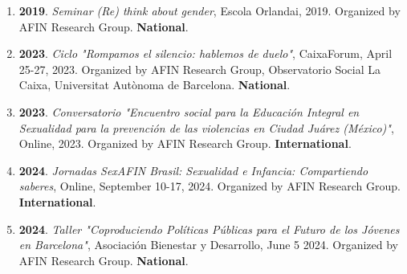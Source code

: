 \begin{enumerate}
\item {\bf 2019}. {\it Seminar (Re) think about gender}, Escola Orlandai, 2019. Organized by AFIN Research Group. {\bf National}.\filbreak
\item {\bf 2023}. {\it Ciclo "Rompamos el silencio: hablemos de duelo"}, CaixaForum, April 25-27, 2023. Organized by AFIN Research Group, Observatorio Social La Caixa, Universitat Autònoma de Barcelona. {\bf National}.\filbreak
\item {\bf 2023}. {\it Conversatorio "Encuentro social para la Educación Integral en Sexualidad para la prevención de las violencias en Ciudad Juárez (México)"}, Online, 2023. Organized by AFIN Research Group. {\bf International}.\filbreak
\item {\bf 2024}. {\it Jornadas SexAFIN Brasil: Sexualidad e Infancia: Compartiendo saberes}, Online, September 10-17, 2024. Organized by AFIN Research Group. {\bf International}.\filbreak
\item {\bf 2024}. {\it Taller "Coproduciendo Políticas Públicas para el Futuro de los Jóvenes en Barcelona"}, Asociación Bienestar y Desarrollo, June 5 2024. Organized by AFIN Research Group. {\bf National}.\filbreak
\end{enumerate} 
